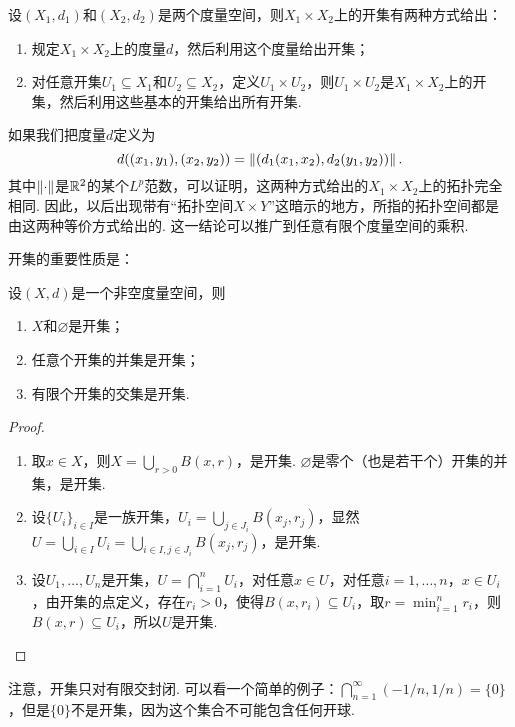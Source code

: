 \begin{example}[乘积拓扑空间]\label{ex:product-topology}
    设$(X_1,d_1)$和$(X_2,d_2)$是两个度量空间，则$X_1\times X_2$上的开集有两种方式给出：
    \begin{enumerate}
        \item 规定$X_1\times X_2$上的度量$d$，然后利用这个度量给出开集；
        \item 对任意开集$U_1\subseteq X_1$和$U_2\subseteq X_2$，定义$U_1\times U_2$，则$U_1\times U_2$是$X_1\times X_2$上的开集，然后利用这些基本的开集给出所有开集. 
    \end{enumerate}
    如果我们把度量$d$定义为
    \[d((x_1,y_1),(x_2,y_2))=\left\|(d_1(x_1,x_2),d_2(y_1,y_2))\right\|.\]
    其中$\left\|\cdot\right\|$是$\mathbb{R}^2$的某个$L^p$范数，可以证明，这两种方式给出的$X_1\times X_2$上的拓扑完全相同. 因此，以后出现带有“拓扑空间$X\times Y$”这暗示的地方，所指的拓扑空间都是由这两种等价方式给出的. 这一结论可以推广到任意有限个度量空间的乘积. 
\end{example}

开集的重要性质是：

\begin{proposition}\label{prop:open-prop}
    设$(X,d)$是一个非空度量空间，则
    \begin{enumerate}
        \item $X$和$\varnothing$是开集；
        \item 任意个开集的并集是开集；
        \item 有限个开集的交集是开集. 
    \end{enumerate}
\end{proposition}
\begin{proof}
\begin{enumerate}
    \item 取$x\in X$，则$X=\bigcup_{r>0}B(x,r)$，是开集. $\varnothing$是零个（也是若干个）开集的并集，是开集. 

    \item 设$\{U_i\}_{i\in I}$是一族开集，$U_i=\bigcup_{j\in J_i} B(x_j,r_j)$，显然$U=\bigcup_{i\in I}U_i=\bigcup_{i\in I,j\in J_i} B(x_j,r_j)$，是开集. 

    \item 设$U_1,\dots,U_n$是开集，$U=\bigcap_{i=1}^nU_i$，对任意$x\in U$，对任意$i=1,\dots,n$，$x\in U_i$，由开集的点定义，存在$r_i>0$，使得$B(x,r_i)\subseteq U_i$，取$r=\min_{i=1}^n r_i$，则$B(x,r)\subseteq U_i$，所以$U$是开集. 
\end{enumerate}
\end{proof}
注意，开集只对有限交封闭. 可以看一个简单的例子：$\bigcap_{n=1}^\infty(-1/n,1/n)=\{0\}$，但是$\{0\}$不是开集，因为这个集合不可能包含任何开球. 


